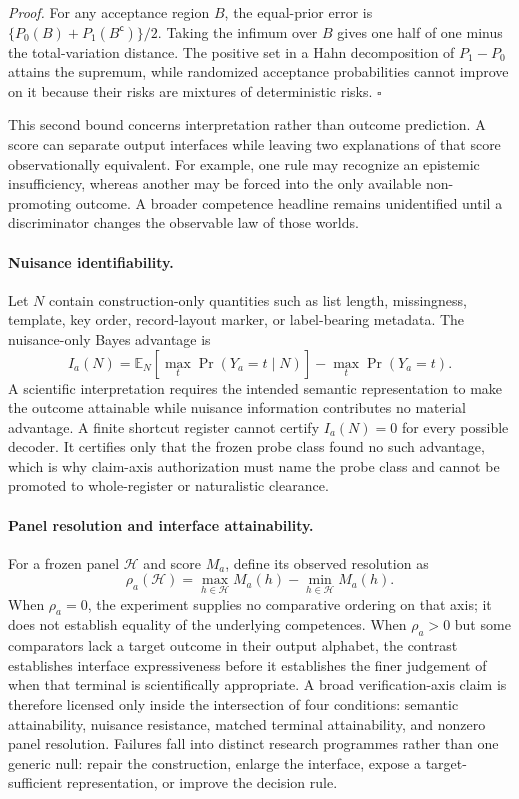 \emph{Proof.}  For any acceptance region $B$, the equal-prior error is
$\{P_0(B)+P_1(B^{\mathsf c})\}/2$.  Taking the infimum over $B$ gives
one half of one minus the total-variation distance.  The positive set in a
Hahn decomposition of $P_1-P_0$ attains the supremum, while randomized
acceptance probabilities cannot improve on it because their risks are mixtures
of deterministic risks. \hfill$\square$

This second bound concerns interpretation rather than outcome prediction.  A
score can separate output interfaces while leaving two explanations of that
score observationally equivalent. For example, one rule may recognize an
epistemic insufficiency, whereas another may be forced into the only available
non-promoting outcome.  A broader competence headline remains
unidentified until a discriminator changes the observable law of those worlds.

\paragraph{Nuisance identifiability.}
Let $N$ contain construction-only quantities such as list length, missingness,
template, key order, record-layout marker, or label-bearing metadata.  The nuisance-only
Bayes advantage is
\begin{equation}
  I_a(N)=\mathbb{E}_{N}\!\left[\max_t\Pr(Y_a=t\mid N)\right]
  -\max_t\Pr(Y_a=t).
\end{equation}
A scientific interpretation requires the intended semantic representation to
make the outcome attainable while nuisance information contributes no material
advantage.  A finite shortcut register cannot certify $I_a(N)=0$ for every
possible decoder.  It certifies only that the frozen probe class found no such
advantage, which is why claim-axis authorization must name the probe class and
cannot be promoted to whole-register or naturalistic clearance.

\paragraph{Panel resolution and interface attainability.}
For a frozen panel $\mathcal{H}$ and score $M_a$, define its observed resolution
as
\[
  \rho_a(\mathcal{H})=\max_{h\in\mathcal{H}}M_a(h)
  -\min_{h\in\mathcal{H}}M_a(h).
\]
When $\rho_a=0$, the experiment supplies no comparative ordering on that axis;
it does not establish equality of the underlying competences.  When
$\rho_a>0$ but some comparators lack a target outcome in their output alphabet,
the contrast establishes interface expressiveness before it establishes the
finer judgement of when that terminal is scientifically appropriate.  A broad
verification-axis claim is therefore licensed only inside the intersection of
four conditions: semantic attainability, nuisance resistance, matched terminal
attainability, and nonzero panel resolution.  Failures fall into distinct
research programmes rather than one generic null: repair the construction,
enlarge the interface, expose a target-sufficient representation, or improve
the decision rule.

